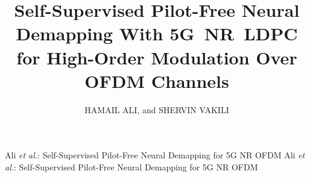 \documentclass{ieeeaccess}
\begin{document}

\title{Self-Supervised Pilot-Free Neural Demapping With 5G~NR~LDPC for High-Order Modulation Over OFDM Channels}

\author{%
  \uppercase{Hamail Ali}, and
  \uppercase{Shervin Vakili}
}

\address[1]{Department of Electrical Engineering, Military College of Signals (MCS),
  National University of Sciences and Technology (NUST), Islamabad 44000, Pakistan
  (e-mail: hamail.hamail-ali@inrs.ca)}

\address[2]{Edge Computing, Communication and Learning (ECCoLe) Laboratory,
  \'Energie Mat\'eriaux T\'el\'ecommunications Research Centre,
  Institut National de la Recherche Scientifique (INRS-EMT), Universit\'e du Qu\'ebec,
  800~De~La~Gaucheti\`ere~West, Suite~6900, Montr\'eal, QC H5A~1K6, Canada
  (e-mail: shervin.vakili@inrs.ca)}


\markboth
  {Ali \textit{et al.}: Self-Supervised Pilot-Free Neural Demapping for 5G NR OFDM}
  {Ali \textit{et al.}: Self-Supervised Pilot-Free Neural Demapping for 5G NR OFDM}

\end{document}
